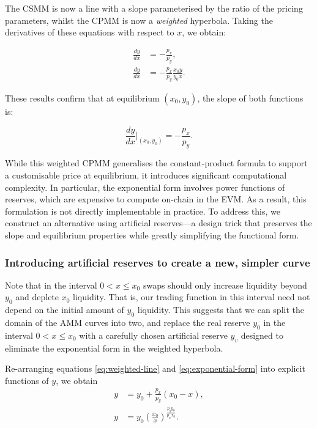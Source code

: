 \documentclass{article}
\begin{document}
The CSMM is now a line with a slope parameterised by the ratio of the pricing parameters, whilst the CPMM is now a \textit{weighted} hyperbola. Taking the derivatives of these equations with respect to $x$, we obtain:

\begin{align}
    \frac{dy}{dx} &= -\frac{p_x}{p_y}, \\
    \frac{dy}{dx} &= -\frac{p_x}{p_y} \frac{x_0 y}{y_0 x}.
\end{align}

These results confirm that at equilibrium $(x_0, y_0)$, the slope of both functions is:

\[
\frac{dy}{dx} \Big|_{(x_0, y_0)} = -\frac{p_x}{p_y}.
\]

While this weighted CPMM generalises the constant-product formula to support a customisable price at equilibrium, it introduces significant computational complexity. In particular, the exponential form involves power functions of reserves, which are expensive to compute on-chain in the EVM. As a result, this formulation is not directly implementable in practice. To address this, we construct an alternative using artificial reserves—a design trick that preserves the slope and equilibrium properties while greatly simplifying the functional form.

\subsubsection{Introducing artificial reserves to create a new, simpler curve}

Note that in the interval $0 < x \leq x_0$ swaps should only increase liquidity beyond $y_0$ and deplete $x_0$ liquidity. That is, our trading function in this interval need not depend on the initial amount of $y_0$ liquidity. This suggests that we can split the domain of the AMM curves into two, and replace the real reserve $y_0$ in the interval $0 < x \leq x_0$ with a carefully chosen artificial reserve $y_v$ designed to eliminate the exponential form in the weighted hyperbola. 

Re-arranging equations \eqref{eq:weighted-line} and \eqref{eq:exponential-form} into explicit functions of $y$, we obtain
\begin{align}
    \label{eq:weighted-line-explicit}
    y &= y_0 + \frac{p_x}{ p_y} (x_0 - x), \\
    \label{eq:exponential-form-explicit}
    y &= y_0 \left( \frac{x_0}{x} \right)^{\frac{p_y y_0}{p_x x_0}}.
\end{align}
\end{document}
